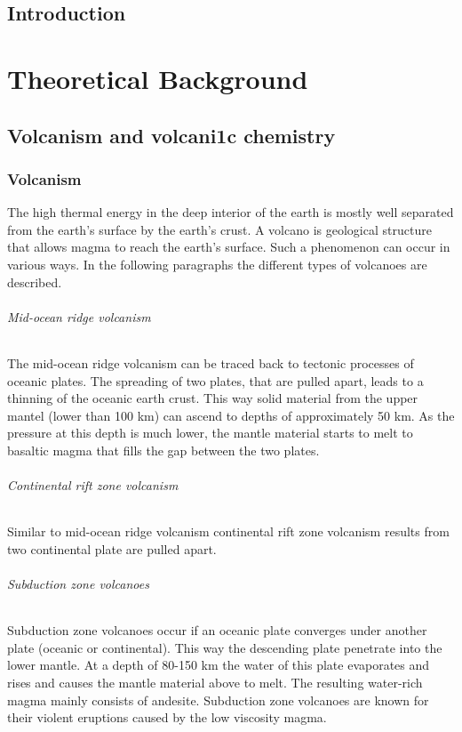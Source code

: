 \documentclass  [
  paper    = a4,
  BCOR     = 10mm,
  twoside,
  fontsize = 12pt,
  fleqn,
  toc      = bibnumbered,
  toc      = listofnumbered,
  numbers  = noendperiod,
  headings = normal,
  listof   = leveldown,
  version  = 3.03
]                                       {scrreprt}
\begin{document}
  

  \tableofcontents
	\chapter{Introduction}	
	
    \part{Theoretical Background}
\chapter{Volcanism and volcani1c chemistry}

\section{Volcanism}
The high thermal energy in the deep interior of the earth is mostly well separated from the earth’s surface by the earth’s crust. A volcano is geological structure that allows magma to reach the earth’s surface. Such a phenomenon can occur in various ways. In the following paragraphs the different types of volcanoes are described.
\paragraph{ Mid-ocean ridge volcanism}
The mid-ocean ridge volcanism can be traced back to tectonic processes of oceanic plates. The spreading of two plates, that are pulled apart, leads to a thinning of the oceanic earth crust. This way solid material from the upper mantel (lower than 100 km) can ascend to depths of approximately 50 km. As the pressure at this depth is much lower, the mantle material starts to melt to basaltic magma that fills the gap between the two plates.
\paragraph{ Continental rift zone volcanism}
Similar to mid-ocean ridge volcanism continental rift zone volcanism results from two continental plate are pulled apart.
\paragraph{ Subduction zone volcanoes}
Subduction zone volcanoes occur if an oceanic plate converges under another plate (oceanic or continental). This way the descending plate penetrate into the lower mantle. At a depth of 80-150 km the water of this plate evaporates and rises and causes the mantle material above to melt. The resulting water-rich magma mainly consists of andesite. Subduction zone volcanoes are known for their violent eruptions caused by the low viscosity magma.
\end{document}
